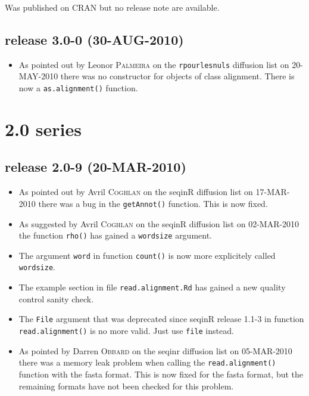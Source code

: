 \documentclass{article}
\begin{document}
Was published on CRAN but no release note are available.

\subsection*{release 3.0-0 (30-AUG-2010)}

\begin{itemize}

\item As pointed out by Leonor \textsc{Palmeira} on the \texttt{rpourlesnuls} diffusion list on 20-MAY-2010 there was no constructor for objects
of class alignment. There is now a \texttt{as.alignment()} function.

\end{itemize}

\section*{2.0 series}

\subsection*{release 2.0-9 (20-MAR-2010)}

\begin{itemize}

\item As pointed out by Avril \textsc{Coghlan} on the seqinR diffusion list on 17-MAR-2010 there was a bug in the \texttt{getAnnot()} function.
This is now fixed.

\item As suggested by Avril \textsc{Coghlan} on the seqinR diffusion list on 02-MAR-2010 the function \texttt{rho()} has gained a \texttt{wordsize}
argument.

\item The argument \texttt{word} in function \texttt{count()} is
now more explicitely called \texttt{wordsize}.

\item The example section in file \texttt{read.alignment.Rd} has gained
a new quality control sanity check.

\item The \texttt{File} argument that was deprecated since seqinR
release 1.1-3 in function \texttt{read.alignment()} is no more valid.
Just use \texttt{file} instead.

\item As pointed by Darren \textsc{Obbard} on the seqinr diffusion list on
05-MAR-2010 there was a memory leak problem when calling the
\texttt{read.alignment()} function with the fasta format. This
is now fixed for the fasta format, but the remaining formats have
not been checked for this problem.

\end{itemize}
\end{document}
